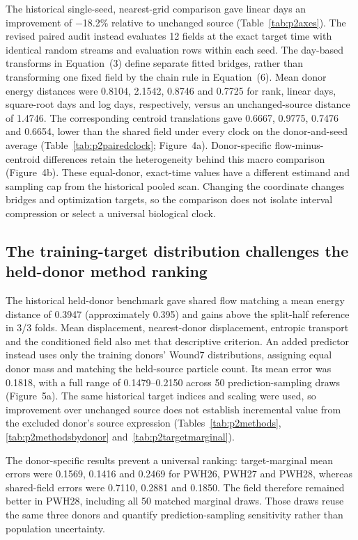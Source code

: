 \documentclass[10pt,a4paper]{article}
\begin{document}
The historical single-seed, nearest-grid comparison gave linear days an improvement of −18.2\% relative to unchanged source (Table~\ref{tab:p2axes}). The revised paired audit instead evaluates 12 fields at the exact target time with identical random streams and evaluation rows within each seed. The day-based transforms in Equation~(3) define separate fitted bridges, rather than transforming one fixed field by the chain rule in Equation~(6). Mean donor energy distances were 0.8104, 2.1542, 0.8746 and 0.7725 for rank, linear days, square-root days and log days, respectively, versus an unchanged-source distance of 1.4746. The corresponding centroid translations gave 0.6667, 0.9775, 0.7476 and 0.6654, lower than the shared field under every clock on the donor-and-seed average (Table~\ref{tab:p2pairedclock}; Figure~4a\label{call:p2f4}). Donor-specific flow-minus-centroid differences retain the heterogeneity behind this macro comparison (Figure~4b). These equal-donor, exact-time values have a different estimand and sampling cap from the historical pooled scan. Changing the coordinate changes bridges and optimization targets, so the comparison does not isolate interval compression or select a universal biological clock.






\subsection{The training-target distribution challenges the held-donor method ranking}

The historical held-donor benchmark gave shared flow matching a mean energy distance of 0.3947 (approximately 0.395) and gains above the split-half reference in 3/3 folds. Mean displacement, nearest-donor displacement, entropic transport and the conditioned field also met that descriptive criterion. An added predictor instead uses only the training donors' Wound7 distributions, assigning equal donor mass and matching the held-source particle count. Its mean error was 0.1818, with a full range of 0.1479--0.2150 across 50 prediction-sampling draws (Figure~5a\label{call:p2f5}). The same historical target indices and scaling were used, so improvement over unchanged source does not establish incremental value from the excluded donor's source expression (Tables~\ref{tab:p2methods}, \ref{tab:p2methodsbydonor} and~\ref{tab:p2targetmarginal}).

The donor-specific results prevent a universal ranking: target-marginal mean errors were 0.1569, 0.1416 and 0.2469 for PWH26, PWH27 and PWH28, whereas shared-field errors were 0.7110, 0.2881 and 0.1850. The field therefore remained better in PWH28, including all 50 matched marginal draws. Those draws reuse the same three donors and quantify prediction-sampling sensitivity rather than population uncertainty.
\end{document}
